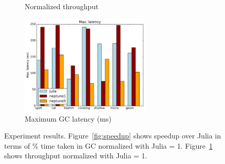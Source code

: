 \begin{figure}[h]
\begin{subfigure}{0.34\textwidth}
      \caption{Normalized throughput}
      \label{fig:throughput}
    \end{subfigure}
    \begin{subfigure}{0.34\textwidth}
      \centering
      \includegraphics[height=4.8cm]{figures/max-latency.pdf}
      \caption{Maximum GC latency (ms)\\}
      \label{fig:latency}
    \end{subfigure}
    \vspace{-0.5em}
    \caption{Experiment results. Figure~\ref{fig:speedup} shows speedup over Julia in terms of \% time taken in GC normalized with Julia = 1. Figure~\ref{fig:throughput} shows throughput normalized with Julia = 1.}
  \label{fig:results}
\end{figure}

